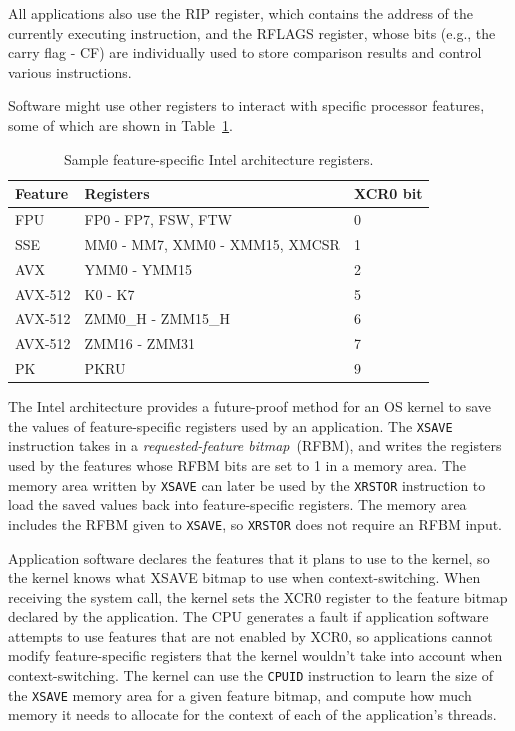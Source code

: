 All applications also use the RIP register, which contains the address of the
currently executing instruction, and the RFLAGS register, whose bits (e.g.,
the carry flag - CF) are individually used to store comparison results and
control various instructions.


Software might use other registers to interact with specific processor
features, some of which are shown in Table~\ref{fig:xsave_state}.

\begin{table}[hbt]
  \centering
  \begin{tabularx}{\columnwidth}{| l | X | l |}
  \hline
  \textbf{Feature} & \textbf{Registers} & \textbf{XCR0 bit}\\
  \hline
  FPU & FP0 - FP7, FSW, FTW & 0 \\
  \hline
  SSE & MM0 - MM7, XMM0 - XMM15, XMCSR & 1 \\
  \hline
  AVX & YMM0 - YMM15 & 2 \\
  \hline
  AVX-512 & K0 - K7 & 5 \\
  \hline
  AVX-512 & ZMM0\_H  - ZMM15\_H & 6 \\
  \hline
  AVX-512 & ZMM16 - ZMM31 & 7 \\
  \hline
  PK & PKRU & 9 \\
  \hline
  \end{tabularx}
  \caption{Sample feature-specific Intel architecture registers.}
  \label{fig:xsave_state}
\end{table}

The Intel architecture provides a future-proof method for an OS kernel to save
the values of feature-specific registers used by an application. The
\texttt{XSAVE} instruction takes in a \textit{requested-feature bitmap}~(RFBM),
and writes the registers used by the features whose RFBM bits are set to 1 in a
memory area. The memory area written by \texttt{XSAVE} can later be used by the
\texttt{XRSTOR} instruction to load the saved values back into feature-specific
registers. The memory area includes the RFBM given to \texttt{XSAVE}, so
\texttt{XRSTOR} does not require an RFBM input.

Application software declares the features that it plans to use to the kernel,
so the kernel knows what XSAVE bitmap to use when context-switching. When
receiving the system call, the kernel sets the XCR0 register to the feature
bitmap declared by the application. The CPU generates a fault if application
software attempts to use features that are not enabled by XCR0, so applications
cannot modify feature-specific registers that the kernel wouldn't take into
account when context-switching. The kernel can use the \texttt{CPUID}
instruction to learn the size of the \texttt{XSAVE} memory area for a given
feature bitmap, and compute how much memory it needs to allocate for the
context of each of the application's threads.
